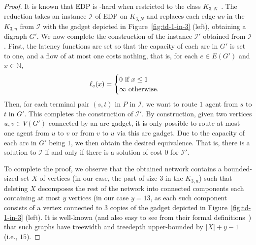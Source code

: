 \documentclass[letterpaper]{article} %
\begin{document}
\begin{proof}
It is known that \textsc{EDP} is \NP-hard when restricted to the class $K_{3,N}$~\cite{FleszarMS18}.
The reduction takes an instance $\mathcal{I}$ of \textsc{EDP} on $K_{3,N}$ and replaces each edge $uv$ in the $K_{3,n}$ from $\mathcal{I}$ with the gadget depicted in Figure~\ref{fig:td-1-in-3} (left), obtaining a digraph $G'$.
We now complete the construction of the instance $\mathcal{I}'$ obtained from $\mathcal{I}$. First, the latency functions are set so that the capacity of each arc in $G'$ is set to one, and a flow of at most one costs nothing, that is, for each $e\in E(G')$ and $x\in \mathbb{N}$,
\[
\ell_e(x) = 
\begin{cases} 
	0 $ if $ x \leq 1 \\
	\infty $ otherwise$.
\end{cases}
\]
Then, for each terminal pair $(s,t)$ in $P$ in $\mathcal{I}$, we want to route $1$ agent from $s$ to $t$ in $G'$.
This completes the construction of $\mathcal{I}'$.
By construction, given two vertices $u,v\in V(G')$ connected by an arc gadget, it is only possible to route at most one agent from $u$ to $v$ or from $v$ to $u$ via this arc gadget.
Due to the capacity of each arc in $G'$ being $1$, we then obtain the desired equivalence.
That is, there is a solution to $\mathcal{I}$ if and only if there is a solution of cost $0$ for $\mathcal{I}'$.

To complete the proof, we observe that the obtained network contains a bounded-sized set $X$ of vertices (in our case, the part of size $3$ in the $K_{3,n}$) such that deleting $X$ decomposes the rest of the network into connected components each containing at most $y$ vertices (in our case $y=13$, as each such component consists of a vertex connected to $3$ copies of the gadget depicted in Figure~\ref{fig:td-1-in-3} (left). It is well-known (and also easy to see from their formal definitions~\cite{RobertsonS86,sparsity,CyganFKLMPPS15}) that such graphs have treewidth and treedepth upper-bounded by $|X|+y-1$ (i.e., $15$).
\end{proof}
\end{document}
